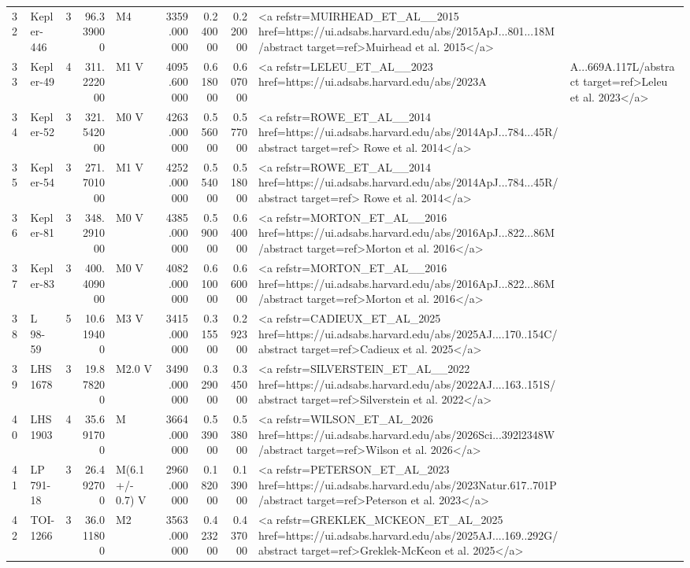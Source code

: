 \begin{tabular}{llrrlrrrl}
32 & Kepler-446 & 3 & 96.339000 & M4 & 3359.000000 & 0.240000 & 0.220000 & <a refstr=MUIRHEAD_ET_AL__2015 href=https://ui.adsabs.harvard.edu/abs/2015ApJ...801...18M/abstract target=ref>Muirhead et al. 2015</a> \\
33 & Kepler-49 & 4 & 311.222000 & M1 V & 4095.600000 & 0.618000 & 0.607000 & <a refstr=LELEU_ET_AL__2023 href=https://ui.adsabs.harvard.edu/abs/2023A&A...669A.117L/abstract target=ref>Leleu et al. 2023</a> \\
34 & Kepler-52 & 3 & 321.542000 & M0 V & 4263.000000 & 0.556000 & 0.577000 & <a refstr=ROWE_ET_AL__2014 href=https://ui.adsabs.harvard.edu/abs/2014ApJ...784...45R/abstract target=ref> Rowe et al. 2014</a> \\
35 & Kepler-54 & 3 & 271.701000 & M1 V & 4252.000000 & 0.554000 & 0.518000 & <a refstr=ROWE_ET_AL__2014 href=https://ui.adsabs.harvard.edu/abs/2014ApJ...784...45R/abstract target=ref> Rowe et al. 2014</a> \\
36 & Kepler-81 & 3 & 348.291000 & M0 V & 4385.000000 & 0.590000 & 0.640000 & <a refstr=MORTON_ET_AL__2016 href=https://ui.adsabs.harvard.edu/abs/2016ApJ...822...86M/abstract target=ref>Morton et al. 2016</a> \\
37 & Kepler-83 & 3 & 400.409000 & M0 V & 4082.000000 & 0.610000 & 0.660000 & <a refstr=MORTON_ET_AL__2016 href=https://ui.adsabs.harvard.edu/abs/2016ApJ...822...86M/abstract target=ref>Morton et al. 2016</a> \\
38 & L 98-59 & 5 & 10.619400 & M3 V & 3415.000000 & 0.315500 & 0.292300 & <a refstr=CADIEUX_ET_AL_2025 href=https://ui.adsabs.harvard.edu/abs/2025AJ....170..154C/abstract target=ref>Cadieux et al. 2025</a> \\
39 & LHS 1678 & 3 & 19.878200 & M2.0 V & 3490.000000 & 0.329000 & 0.345000 & <a refstr=SILVERSTEIN_ET_AL__2022 href=https://ui.adsabs.harvard.edu/abs/2022AJ....163..151S/abstract target=ref>Silverstein et al. 2022</a> \\
40 & LHS 1903 & 4 & 35.691700 & M & 3664.000000 & 0.539000 & 0.538000 & <a refstr=WILSON_ET_AL_2026 href=https://ui.adsabs.harvard.edu/abs/2026Sci...392l2348W/abstract target=ref>Wilson et al. 2026</a> \\
41 & LP 791-18 & 3 & 26.492700 & M(6.1 +/- 0.7) V & 2960.000000 & 0.182000 & 0.139000 & <a refstr=PETERSON_ET_AL_2023 href=https://ui.adsabs.harvard.edu/abs/2023Natur.617..701P/abstract target=ref>Peterson et al. 2023</a> \\
42 & TOI-1266 & 3 & 36.011800 & M2 & 3563.000000 & 0.423200 & 0.437000 & <a refstr=GREKLEK_MCKEON_ET_AL_2025 href=https://ui.adsabs.harvard.edu/abs/2025AJ....169..292G/abstract target=ref>Greklek-McKeon et al. 2025</a> \\

\end{tabular}

